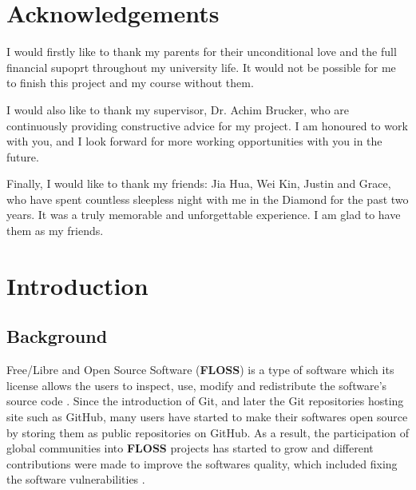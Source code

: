 \documentclass[12pt, a4paper]{report}
\begin{document}
\newpage


\chapter*{Acknowledgements}
I would firstly like to thank my parents for their unconditional love and the full financial supoprt
throughout my university life. It would not be possible for me to finish this project and my course
without them.

I would also like to thank my supervisor, Dr. Achim Brucker, who are continuously providing
constructive advice for my project. I am honoured to work with you, and I look forward for more
working opportunities with you in the future.

Finally, I would like to thank my friends: Jia Hua, Wei Kin, Justin and Grace, who have spent
countless sleepless night with me in the Diamond for the past two years. It was a truly memorable
and unforgettable experience. I am glad to have them as my friends.

\newpage

\tableofcontents

\listoffigures {}

\listoftables {}

\newpage


\chapter{Introduction}
\section{Background}
Free/Libre and Open Source Software (\textbf{FLOSS}) is a type of software which its license allows
the users to inspect, use, modify and redistribute the software's source code \cite{crowston_2012}.
Since the introduction of Git, and later the Git repositories hosting site such as GitHub, many
users have started to make their softwares open source by storing them as public repositories on
GitHub. As a result, the participation of global communities into \textbf{FLOSS} projects has
started to grow and different contributions were made to improve the softwares quality, which
included fixing the software vulnerabilities \cite{dabbish_2012}.
\end{document}
